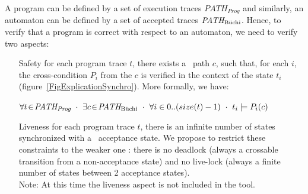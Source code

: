 \documentclass{frama-c-book}
\begin{document}
A program can be defined by a set of execution traces
$\textit{PATH}_{\textit{Prog}}$ and similarly, an automaton can be defined by a
set of accepted traces $\textit{PATH}_{\textnormal{B\"uchi}}$. Hence, to verify that a program
is correct with respect to an automaton, we need to verify two aspects:
\begin{itemize}
  \item[Safety] for each program trace $t$, there exists a \buchi\ path $c$,
    such that, for each $i$, the cross-condition $P_i$ from the $c$ is verified
    in the context of the state $t_i$ (figure~\ref{FigExplicationSynchro}). More
    formally, we have:

    \centerline{
      $\forall t \!\in\! \textit{PATH}_{\textit{Prog}} ~\cdot~ \exists c \!\in\!
      \textit{PATH}_{\textnormal{B\"uchi}} ~\cdot~ \forall i\in 0..(size(t)-1) ~\cdot~ t_i
      \models P_i(c)$
    }


  \item[Liveness] for each program trace $t$, there is an infinite number of
    states synchronized with a \buchi\ acceptance state. We propose to restrict
    these constraints to the weaker one : there is no deadlock (always a
    crossable transition from a non-acceptance state) and no live-lock (always a
    finite number of states between 2 acceptance states).\\
  Note: At this time the liveness aspect is not included in the tool.

\end{itemize}
\end{document}
